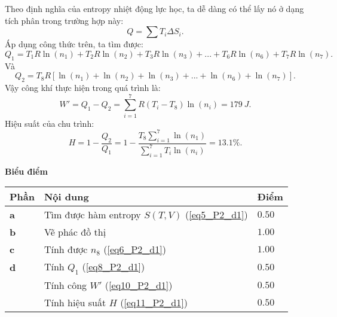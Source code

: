 \begin{enumerate}[label=\textbf{\alph*,}]
Theo định nghĩa của entropy nhiệt động lực học, ta dễ dàng có thể lấy nó ở dạng tích phân trong trường hợp này:
\begin{equation} \label{eq7_P2_d1}
    Q = \sum T_i \Delta S_i.
\end{equation}
Áp dụng công thức trên, ta tìm được:
\begin{equation} \label{eq8_P2_d1}
    Q_1 = T_1 R \ln (n_1) + T_2 R \ln (n_2) + T_3 R \ln (n_3) +...+ T_6 R \ln (n_6) + T_7 R \ln (n_7).
\end{equation}
Và 
\begin{equation} \label{eq9_P2_d1}
    Q_2 = T_8 R \left[ \ln (n_1) + \ln (n_2) + \ln (n_3) +...+ \ln(n_6) + \ln (n_7)  \right].
\end{equation}
Vậy công khí thực hiện trong quá trình là:
\begin{equation} \label{eq10_P2_d1}
    W'= Q_1 - Q_2 = \sum_{i=1}^7 R \left( T_i - T_8 \right) \ln (n_i) = \SI{179}{J}.
\end{equation}
Hiệu suất của chu trình:
\begin{equation} \label{eq11_P2_d1}
    H = 1 - \frac{Q_2}{Q_1} = 1 - \frac{\displaystyle T_8 \sum_{i=1}^7 \ln (n_1)}{\displaystyle \sum_{i=1}^7 T_i \ln (n_i)} = 13.1 \%.
\end{equation}

\end{enumerate}

\textbf{Biểu điểm} 
\begin{center}
\begin{tabular}{|>{\centering\arraybackslash}m{1cm}|>{\raggedright\arraybackslash}m{14cm}| >{\centering\arraybackslash}m{1cm}|}
    \hline
\textbf{Phần} & \textbf{Nội dung} & \textbf{Điểm} \\
    \hline
    \textbf{a} & Tìm được hàm entropy $S(T,V)$ (\ref{eq5_P2_d1}) & $0.50$ \\
    \hline
    \textbf{b} & Vẽ phác đồ thị & $1.00$ \\
    \hline
    \textbf{c} & Tính được $n_8$ (\ref{eq6_P2_d1}) & $1.00$ \\
    \hline
    \textbf{d} & Tính $Q_1$ (\ref{eq8_P2_d1}) & $0.50$ \\
    \cline{2-3}
    & Tính công $W'$ (\ref{eq10_P2_d1}) & $0.50$ \\ 
    \cline{2-3}
    & Tính hiệu suất $H$ (\ref{eq11_P2_d1}) & $0.50$ \\
    \hline
\end{tabular}
\end{center}

